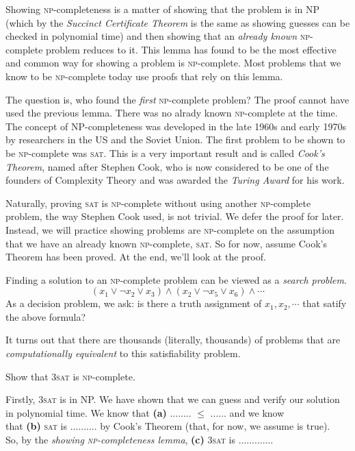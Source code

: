 Showing \textsc{np}-completeness is a matter of showing that the problem is in
NP (which by the \textit{Succinct Certificate Theorem} is the same as showing 
guesses can be checked in polynomial time) and then 
showing that an \textit{already known} \textsc{np}-complete problem reduces to it. 
This lemma has found to be the most effective and common way for showing a 
problem is \textsc{np}-complete. Most problems that we know to be 
\textsc{np}-complete today use proofs that rely on this lemma.

The question is, who found the \textit{first} \textsc{np}-complete problem?
The proof cannot have used the previous lemma. There was no alrady known 
\textsc{np}-complete at the time.
The concept of NP-completeness was developed in the late 1960s 
and early 1970s by researchers in the US and the Soviet Union.
The first problem to be shown to be \textsc{np}-complete was \textsc{sat}.
This is a very important result and is called \textit{Cook's Theorem}, named 
after Stephen Cook, who is now considered to be one of the founders of Complexity Theory 
and was awarded the \textit{Turing Award} for his work. 


Naturally, proving \textsc{sat} is \textsc{np}-complete without using 
another \textsc{np}-complete problem, the way Stephen Cook used, is 
not trivial. We defer the proof for later. Instead, we will practice 
showing problems are \textsc{np}-complete on the assumption that 
we have an already known \textsc{np}-complete, \textsc{sat}. 
So for now, assume Cook's Theorem has been proved. 
At the end, we'll look at the proof.

\frmrule

Finding a solution to an \textsc{np}-complete problem can be viewed as a \textit{search problem}.
$$(x_1 \vee \neg x_2 \vee x_3) \wedge (x_2 \vee \neg x_5 \vee x_6) \wedge \dotsm $$
As a decision problem, we ask: 
is there a truth assignment of $x_1, x_2, \dotsm$ that satify the above formula?

It turns out that there are thousands (literally, thousands) of problems that 
are \textit{computationally equivalent} to this satisfiability problem.

\frmrule

\begin{example}
Show that \textsc{3sat} is \textsc{np}-complete.

Firstly, \textsc{3sat} is in NP. We have shown that we 
can guess and verify our solution in polynomial time. 
We know that \textbf{(a)} ........ $\leqslant$ ...... and we know \\
that \textbf{(b)}  \textsc{sat} is .......... by Cook's Theorem 
(that, for now, we assume is true). \\
So, by the \textit{showing \textsc{np}-completeness lemma}, 
\textbf{(c)} \textsc{3sat} is  .............

\end{example}

